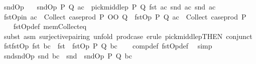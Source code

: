\begin{isabellebody}
\isanewline
{}\isamarkupfalse%
\ sndOp\ \isanewline
\ \ {\isachardoublequoteopen}sndOp\ P\ Q\ ac\ {\isacharequal}{\kern0pt}\ {\isacharparenleft}{\kern0pt}pick{\isacharunderscore}{\kern0pt}middlep\ P\ Q\ {\isacharparenleft}{\kern0pt}fst\ ac{\isacharparenright}{\kern0pt}\ {\isacharparenleft}{\kern0pt}snd\ ac{\isacharparenright}{\kern0pt}{\isacharcomma}{\kern0pt}\ {\isacharparenleft}{\kern0pt}snd\ ac{\isacharparenright}{\kern0pt}{\isacharparenright}{\kern0pt}{\isachardoublequoteclose}\isanewline
\isanewline
{}\isamarkupfalse%
\ fstOp{\isacharunderscore}{\kern0pt}in{\isacharcolon}{\kern0pt}\ {\isachardoublequoteopen}ac\ {\isasymin}\ Collect\ {\isacharparenleft}{\kern0pt}case{\isacharunderscore}{\kern0pt}prod\ {\isacharparenleft}{\kern0pt}P\ OO\ Q{\isacharparenright}{\kern0pt}{\isacharparenright}{\kern0pt}\ {\isasymLongrightarrow}\ fstOp\ P\ Q\ ac\ {\isasymin}\ Collect\ {\isacharparenleft}{\kern0pt}case{\isacharunderscore}{\kern0pt}prod\ P{\isacharparenright}{\kern0pt}{\isachardoublequoteclose}\isanewline
%
\isadelimproof
\ \ %
\endisadelimproof
%
\isatagproof
{}\isamarkupfalse%
\ fstOp{\isacharunderscore}{\kern0pt}def\ mem{\isacharunderscore}{\kern0pt}Collect{\isacharunderscore}{\kern0pt}eq\isanewline
\ \ \isamarkupfalse%
\ {\isacharparenleft}{\kern0pt}subst\ {\isacharparenleft}{\kern0pt}asm{\isacharparenright}{\kern0pt}\ surjective{\isacharunderscore}{\kern0pt}pairing{\isacharcomma}{\kern0pt}\ unfold\ prod{\isachardot}{\kern0pt}case{\isacharparenright}{\kern0pt}\ {\isacharparenleft}{\kern0pt}erule\ pick{\isacharunderscore}{\kern0pt}middlep{\isacharbrackleft}{\kern0pt}THEN\ conjunct{}{\isacharbrackright}{\kern0pt}{\isacharparenright}{\kern0pt}%
\endisatagproof
{\isafoldproof}%
%
\isadelimproof
\isanewline
%
\endisadelimproof
\isanewline
{}\isamarkupfalse%
\ fst{\isacharunderscore}{\kern0pt}fstOp{\isacharcolon}{\kern0pt}\ {\isachardoublequoteopen}fst\ bc\ {\isacharequal}{\kern0pt}\ {\isacharparenleft}{\kern0pt}fst\ {\isasymcirc}\ fstOp\ P\ Q{\isacharparenright}{\kern0pt}\ bc{\isachardoublequoteclose}\isanewline
%
\isadelimproof
\ \ %
\endisadelimproof
%
\isatagproof
{}\isamarkupfalse%
\ comp{\isacharunderscore}{\kern0pt}def\ fstOp{\isacharunderscore}{\kern0pt}def\ \isamarkupfalse%
\ simp%
\endisatagproof
{\isafoldproof}%
%
\isadelimproof
\isanewline
%
\endisadelimproof
\isanewline
{}\isamarkupfalse%
\ snd{\isacharunderscore}{\kern0pt}sndOp{\isacharcolon}{\kern0pt}\ {\isachardoublequoteopen}snd\ bc\ {\isacharequal}{\kern0pt}\ {\isacharparenleft}{\kern0pt}snd\ {\isasymcirc}\ sndOp\ P\ Q{\isacharparenright}{\kern0pt}\ bc{\isachardoublequoteclose}\isanewline

\end{isabellebody}
